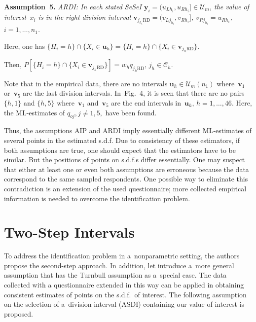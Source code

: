 \begin{multicols}{2}
\noindent
\textbf{Assumption~5.}
\textit{ARDI: In each stated SeSeI 
$\mathbf{y}_i$\linebreak $ =(u_{Lh_i} , u_{Rh_i}] \in \mathcal{U}_m$,
 the value of interest~$x_i$
   is in the right division interval $ \mathbf{v}_{j_{h_i} \mathrm{RD} }
   =(v_{Lj_{h_i}}, v_{Rh_i}]$, $v_{Rj_{h_i}} = u_{Rh_i}$, $i=1, \ldots, n_1$.
}

\smallskip

    Here, one has
    $\{ H_i =h\} \cap \{ X_i \in \mathbf{u}_h\} =\{ H_i$\linebreak $ =h\} \cap\{ X_i \in 
    \mathbf{v} _{j_h \mathrm{RD}} \}$.

    Then, $ P [ \{ H_i =h\} \cap \{ X_i \in \mathbf{v} _{j_h \mathrm{RD}} \} ]= 
    w_h q_{j_h \mathrm{RD}}$, $j_h\in\mathcal{C}_h$.


Note that in the empirical data, there are no intervals 
$\mathbf{u}_h \in\mathcal{U}_m(n_1)$ where~$\mathbf{v}_1$ or~$\mathbf{v}_5$ are 
the last division intervals.
In~Fig.~4, it is seen that there are no pairs $\{ h, 1\}$ and $\{ h, 5\}$ 
where~$\mathbf{v}_1$ and~$\mathbf{v}_5$
 are the end intervals in~$\mathbf{u}_h$, $h=1, \ldots, 46.$
 Here,  the ML-estimates of $q_{oj}, j\not=1, 5,$ have been found.

  Thus, the assumptions AIP and ARDI imply essentially different ML-estimates of several points
  in the estimated s.d.f. Due to consistency of these estimators, if both assumptions
  are true, one should expect that the estimators have to be  similar. But the positions of points on s.d.f.s
 differ essentially.
   One may suspect that either at least one or even both assumptions are erroneous because
  the data correspond to the same sampled respondents.  One possible way to eliminate this
  contradiction is an extension of the used questionnaire; more collected empirical information 
  is needed to overcome the identification problem.
  
  \vspace*{-6pt}

\section{Two-Step Intervals} %

\noindent
To address the identification problem in a~nonparametric setting,
the authors propose the second-step approach. In addition,
let introduce a~more general assumption that has the Turnbull assumption as a~special case. The data collected with
a questionnaire extended in this way can be applied in
obtaining consistent estimates of points on the s.d.f.\ of interest. The following
assumption on the selection of a~division interval (ASDI) containing our value of interest is proposed.


\end{multicols}
